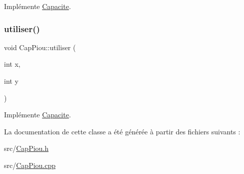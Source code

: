 Implémente \hyperlink{class_capacite_a7d4e86c20cd198960f25c0eb443148fe}{Capacite}.

\mbox{\label{class_cap_piou_a20ed7a993ce209a3df246f655f107f22}} 
\subsubsection{\texorpdfstring{utiliser()}{utiliser()}}
{\footnotesize\ttfamily void Cap\+Piou\+::utiliser (\begin{DoxyParamCaption}\item[{int}]{x,  }\item[{int}]{y }\end{DoxyParamCaption})\hspace{0.3cm}{\ttfamily [virtual]}}



Implémente \hyperlink{class_capacite_a4d4f643987fcc2168567bf28a36ea418}{Capacite}.



La documentation de cette classe a été générée à partir des fichiers suivants \+:\begin{DoxyCompactItemize}
\item 
src/\hyperlink{_cap_piou_8h}{Cap\+Piou.\+h}\item 
src/\hyperlink{_cap_piou_8cpp}{Cap\+Piou.\+cpp}\end{DoxyCompactItemize}
